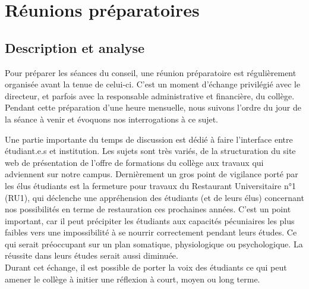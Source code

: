 \documentclass{article}
\begin{document}
\section{Réunions préparatoires} 

\subsection{Description et analyse}
Pour préparer les séances du conseil, une réunion préparatoire est régulièrement organisée avant la tenue de celui-ci. 
C'est un moment d'échange privilégié avec le directeur, et parfois avec la responsable administrative et financière, du collège. 
Pendant cette préparation d'une heure mensuelle, nous suivons l'ordre du jour de la séance à venir et évoquons nos interrogations à ce sujet. 

Une partie importante du temps de discussion est dédié à faire l'interface entre étudiant.e.s et institution. 
Les sujets sont très variés, de la structuration du site web de présentation de l'offre de formations du collège aux travaux qui adviennent sur notre campus. 
Dernièrement un gros point de vigilance porté par les élus étudiants est la fermeture pour travaux du Restaurant Universitaire n°1 (RU1), qui déclenche une appréhension des étudiants (et de leurs élus) concernant nos possibilités en terme de restauration ces prochaines années.
C'est un point important, car il peut précipiter les étudiants aux capacités pécuniaires les plus faibles vers une impossibilité à se nourrir correctement pendant leurs études. 
Ce qui serait préoccupant sur un plan somatique, physiologique ou psychologique. 
La réussite dans leurs études serait aussi diminuée. \\ 
Durant cet échange, il est possible de porter la voix des étudiants ce qui peut amener le collège à initier une réflexion à court, moyen ou long terme.
\end{document}
